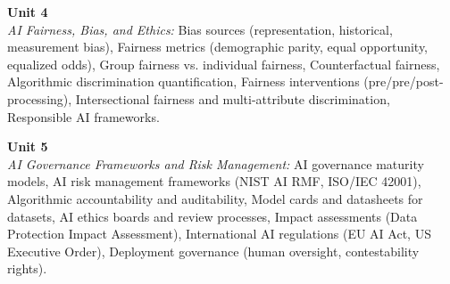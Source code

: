 \noindent\textbf{Unit 4} \\
\textit{AI Fairness, Bias, and Ethics:} Bias sources (representation, historical, measurement bias), Fairness metrics (demographic parity, equal opportunity, equalized odds), Group fairness vs. individual fairness, Counterfactual fairness, Algorithmic discrimination quantification, Fairness interventions (pre/pre/post-processing), Intersectional fairness and multi-attribute discrimination, Responsible AI frameworks.

\vspace{0.3cm}

\noindent\textbf{Unit 5} \\
\textit{AI Governance Frameworks and Risk Management:} AI governance maturity models, AI risk management frameworks (NIST AI RMF, ISO/IEC 42001), Algorithmic accountability and auditability, Model cards and datasheets for datasets, AI ethics boards and review processes, Impact assessments (Data Protection Impact Assessment), International AI regulations (EU AI Act, US Executive Order), Deployment governance (human oversight, contestability rights).

\newpage
{}
